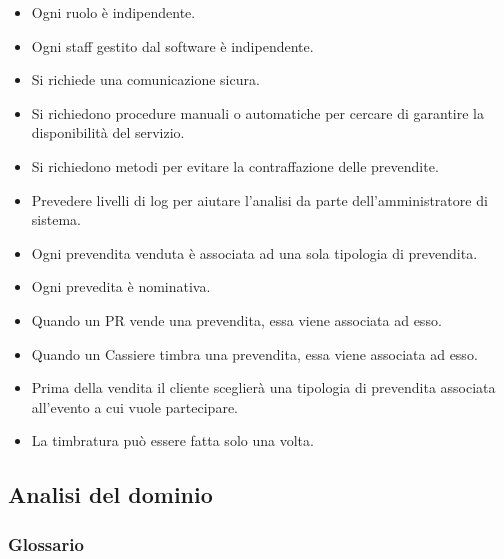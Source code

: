 \documentclass[a4paper]{article}
\begin{document}
\begin{itemize}
	\item Ogni ruolo è indipendente.
	\item Ogni staff gestito dal software è indipendente.
	
	\item Si richiede una comunicazione sicura.
	
	\item Si richiedono procedure manuali o automatiche per cercare di garantire la disponibilità del servizio.
	
	\item Si richiedono metodi per evitare la contraffazione delle prevendite.
	
	\item Prevedere livelli di log per aiutare l'analisi da parte dell'amministratore di sistema.
	
	\item Ogni prevendita venduta è associata ad una sola tipologia di prevendita.
	\item Ogni prevedita è nominativa.
	
	\item Quando un PR vende una prevendita, essa viene associata ad esso.
	\item Quando un Cassiere timbra una prevendita, essa viene associata ad esso.
	
	\item Prima della vendita il cliente sceglierà una tipologia di prevendita associata all'evento a cui vuole partecipare.
	
	\item La timbratura può essere fatta solo una volta.
	
	
\end{itemize}

\newpage

\subsection{Analisi del dominio}

\subsubsection{Glossario}
\end{document}
